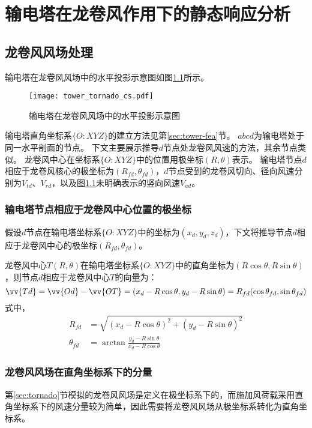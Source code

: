 \graphicspath{{figures/static/}}
\chapter{输电塔在龙卷风作用下的静态响应分析}
\section{龙卷风风场处理}
输电塔在龙卷风风场中的水平投影示意图如图\ref{fig:tower-tornado-cs}所示。
\begin{figure}[!htpb]
  \centering
  \texttt{[image: tower\_tornado\_cs.pdf]}
  \caption{输电塔在龙卷风风场中的水平投影示意图}
  \label{fig:tower-tornado-cs}
\end{figure}
输电塔直角坐标系$\{O: XYZ\}$的建立方法见第\ref{sec:tower-fea}节。
$abcd$为输电塔处于同一水平剖面的节点。
下文主要展示推导$d$节点处龙卷风风速的方法，其余节点类似。
龙卷风中心在坐标系$\{O: XYZ\}$中的位置用极坐标$(R, \theta)$表示。
输电塔节点$d$相应于龙卷风核心的极坐标为$(R_{fd}, \theta_{fd})$，$d$节点受到的龙卷风切向、径向风速分别为$V_{td}$、$V_{rd}$，以及图\ref{fig:tower-tornado-cs}未明确表示的竖向风速$V_{ad}$。

\subsection{输电塔节点相应于龙卷风中心位置的极坐标}\label{sec:d-polor}
假设$d$节点在输电塔坐标系$\{O: XYZ\}$中的坐标为$(x_d, y_d, z_d)$，下文将推导节点$d$相应于龙卷风中心的极坐标$(R_{fd}, \theta_{fd})$。

龙卷风中心$T(R, \theta)$在输电塔坐标系$\{O: XYZ\}$中的直角坐标为$(R\cos\theta, R\sin\theta)$，则节点$d$相应于龙卷风中心$T$的向量为：
\begin{equation}
  \vv{Td} = \vv{Od} - \vv{OT} = (x_d - R\cos\theta, y_d - R\sin\theta) = R_{fd}(\cos\theta_{fd}, \sin\theta_{fd})
\end{equation}
式中，
\begin{equation}
\begin{split}
  R_{fd} & = \sqrt{(x_d-R\cos\theta)^2+(y_d-R\sin\theta)^2} \\
  \theta_{fd} & = \arctan \frac{y_d - R\sin\theta}{x_d - R\cos\theta}
\end{split}
\end{equation}

\subsection{龙卷风风场在直角坐标系下的分量}\label{sec:cs}
第\ref{sec:tornado}节模拟的龙卷风风场是定义在极坐标系下的，而施加风荷载采用直角坐标系下的风速分量较为简单，因此需要将龙卷风风场从极坐标系转化为直角坐标系。

